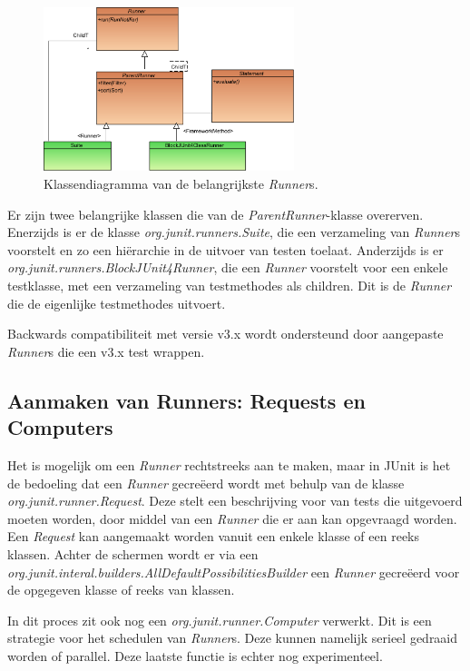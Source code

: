 \documentclass[i1]{oss}
\begin{document}
\begin{figure}[hb!]
	\centering
	\includegraphics[width=0.65\textwidth]{ClassDiagramRunner}
	\caption{Klassendiagramma van de belangrijkste \emph{Runner}s.}
	\label{fig:diagrams:Runner}
\end{figure}

Er zijn twee belangrijke klassen die van de \emph{ParentRunner}-klasse overerven. Enerzijds is er de klasse \emph{org.junit.runners.Suite}, die een verzameling van \emph{Runner}s voorstelt en zo een hi\"erarchie in de uitvoer van testen toelaat. Anderzijds is er \emph{org.junit.runners.BlockJUnit4Runner}, die een \emph{Runner} voorstelt voor een enkele testklasse, met een verzameling van testmethodes als children. Dit is de \emph{Runner} die de eigenlijke testmethodes uitvoert.

Backwards compatibiliteit met versie v3.x wordt ondersteund door aangepaste \emph{Runner}s die een v3.x test wrappen.

\subsection{Aanmaken van Runners: Requests en Computers}

Het is mogelijk om een \emph{Runner} rechtstreeks aan te maken, maar in JUnit is het de bedoeling dat een \emph{Runner} gecre\"eerd wordt met behulp van de klasse \emph{org.junit.runner.Request}. Deze stelt een beschrijving voor van tests die uitgevoerd moeten worden, door middel van een \emph{Runner} die er aan kan opgevraagd worden. Een \emph{Request} kan aangemaakt worden vanuit een enkele klasse of een reeks klassen. Achter de schermen wordt er via een \emph{org.junit.interal.builders.AllDefaultPossibilitiesBuilder} een \emph{Runner} gecre\"eerd voor de opgegeven klasse of reeks van klassen.

In dit proces zit ook nog een \emph{org.junit.runner.Computer} verwerkt. Dit is een strategie voor het schedulen van \emph{Runner}s. Deze kunnen namelijk serieel gedraaid worden of parallel. Deze laatste functie is echter nog experimenteel.
\end{document}
